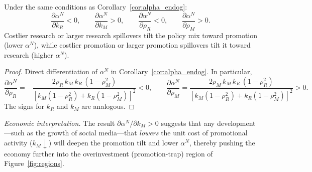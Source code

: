 \begin{corollary}\label{cor:alpha_compstatics}
Under the same conditions as Corollary~\ref{cor:alpha_endog}:
\[
\frac{\partial \alpha^N}{\partial k_R}<0,\qquad
\frac{\partial \alpha^N}{\partial k_M}>0,\qquad
\frac{\partial \alpha^N}{\partial \rho_R}<0,\qquad
\frac{\partial \alpha^N}{\partial \rho_M}>0.
\]
Costlier research or larger research spillovers tilt the policy mix toward promotion (lower $\alpha^N$), while costlier promotion or larger promotion spillovers tilt it toward research (higher $\alpha^N$).
\end{corollary}

\begin{proof}
Direct differentiation of $\alpha^N$ in Corollary~\ref{cor:alpha_endog}. In particular,
\[
\frac{\partial\alpha^N}{\partial\rho_R}
=-\frac{2\rho_R\, k_M\, k_R\,(1-\rho_M^2)}{[k_M(1-\rho_R^2)+k_R(1-\rho_M^2)]^2}<0,
\qquad
\frac{\partial\alpha^N}{\partial\rho_M}
=\frac{2\rho_M\, k_M\, k_R\,(1-\rho_R^2)}{[k_M(1-\rho_R^2)+k_R(1-\rho_M^2)]^2}>0.
\]
The signs for $k_R$ and $k_M$ are analogous.
\end{proof}

\noindent\textit{Economic interpretation.}
The result $\partial\alpha^N/\partial k_M>0$ suggests that any development---such as the growth of social media---that \emph{lowers} the unit cost of promotional activity ($k_M\downarrow$) will deepen the promotion tilt and lower $\alpha^N$, thereby pushing the economy further into the overinvestment (promotion-trap) region of Figure~\ref{fig:regions}.

